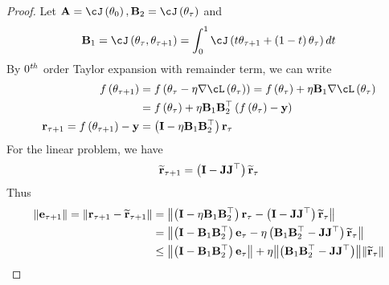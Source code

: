 \documentclass[a4paper]{article}
\begin{document}
\begin{proof}
  Let $\vec{A} = \cJ\br{\theta_0},\vec{B}_2=\cJ\br{\theta_\tau}$ and
  \[\vec{B}_1=\cJ\br{\theta_\tau,\theta_{\tau+1}} =
    \int_0^1\cJ\br{t\theta_{\tau+1}+\br{1-t}\theta_\tau}dt\]
  By $0^{\it th}$ order Taylor expansion with remainder term, we can
  write
  \begin{align*}
    f\br{\theta_{\tau+1}} &= f\br{\theta_\tau -
    \eta\nabla\cL\br{\theta_\tau}} = f\br{\theta_\tau} +
                            \eta\vec{B}_1\nabla\cL\br{\vec{\theta_\tau}}\\
                          &= f\br{\theta_\tau} +
                            \eta\vec{B}_1\vec{B}_2^\top\br{f\br{\theta_\tau}
                            - \vec{y}}\\
    \vec{r}_{\tau+1} =  f\br{\theta_{\tau+1}} - \vec{y} &= \br{\vec{I}
                                                          - \eta\vec{B}_1\vec{B}_2^\top}\vec{r}_\tau
  \end{align*}
  For the linear problem, we have
  \[\widetilde{{\mathbf{r}}}_{\tau+1} = \left({{\mathbf{I}} -
      {\mathbf{J}}{\mathbf{J}}^\top}\right)\widetilde{{\mathbf{r}}}_\tau\]
  Thus
  \begin{align*}
    \mathrm{\left\lVert{\mathbf{e}}_{\tau+1}\right\rVert} = \mathrm{\left\lVert{{\mathbf{r}}}_{\tau+1} -
    \widetilde{{\mathbf{r}}}_{\tau+1}\right\rVert} &= \mathrm{\left\lVert\left({{\mathbf{I}}
                                                          -
                                    \eta{\mathbf{B}}_1{\mathbf{B}}_2^\top}\right){\mathbf{r}}_\tau
                                    - \left({{\mathbf{I}} -
                                    {\mathbf{J}}{\mathbf{J}}^\top}\right)\widetilde{{\mathbf{r}}}_\tau\right\rVert}\\
                                  &=\mathrm{\left\lVert\left({{\mathbf{I}} -
                                    {\mathbf{B}}_1{\mathbf{B}}_2^\top}\right){\mathbf{e}}_\tau
                                    - \eta\left({{\mathbf{B}}_1{\mathbf{B}}_2^\top
                                    - {\mathbf{J}}{\mathbf{J}}^\top}\right)\widetilde{{\mathbf{r}}}_\tau\right\rVert}\\
                                 &\le\mathrm{\left\lVert\left({{\mathbf{I}} -
                                    {\mathbf{B}}_1{\mathbf{B}}_2^\top}\right){\mathbf{e}}_\tau\right\rVert}
                                    + \eta\mathrm{\left\lVert\left({{\mathbf{B}}_1{\mathbf{B}}_2^\top
                                    - {\mathbf{J}}{\mathbf{J}}^\top}\right)\right\rVert}\mathrm{\left\lVert\widetilde{{\mathbf{r}}}_\tau\right\rVert}\\
  \end{align*}
  

\end{proof}
\end{document}
